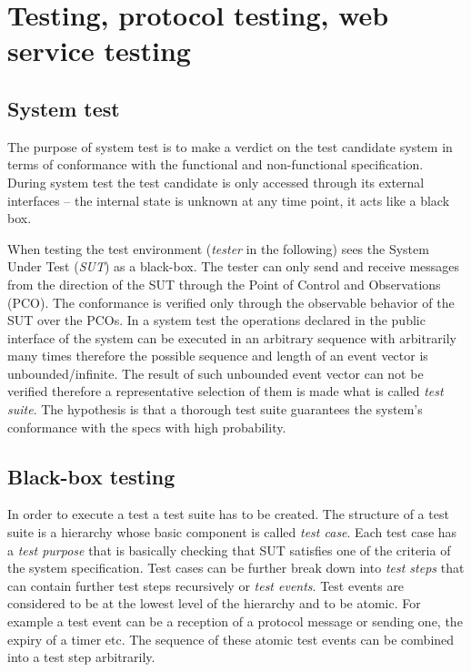 \documentclass[a4paper]{article}
\begin{document}
\section{Testing, protocol testing, web service testing}

\subsection{System test}

The purpose of system test is to make a verdict on the test candidate system in terms of conformance with the
functional and non-functional specification. During system test the test candidate is only accessed through its
external interfaces -- the internal state is unknown at any time point, it acts like a black box.

When testing the test environment (\emph{tester} in the following) sees the System Under Test (\emph{SUT}) as a
black-box. The tester can only send and receive messages from the direction of the SUT through the Point of Control and
Observations (PCO). The conformance is verified only through the observable behavior of the SUT over the PCOs.
In a system test the operations declared in the public interface of the system can be executed in an arbitrary sequence
with arbitrarily many times therefore the possible sequence and length of an event vector is unbounded/infinite. The
result of such unbounded event vector can not be verified therefore a representative selection of them is made what is
called \emph{test suite}. The hypothesis is that a thorough test suite guarantees the system's conformance with the
specs with high probability.

\subsection{Black-box testing}

In order to execute a test a test suite has to be created. The structure of a test suite is a hierarchy whose basic
component is called \emph{test case}. Each test case has a \emph{test purpose} that is basically checking that SUT
satisfies one of the criteria of the system specification. Test cases can be further break down into \emph{test steps}
that can contain further test steps recursively or \emph{test events}. Test events are considered to be at the lowest
level of the hierarchy and to be atomic.
For example a test event can be a reception of a protocol message or sending one, the expiry of a timer etc. The
sequence of these atomic test events can be combined into a test step arbitrarily.
\end{document}
